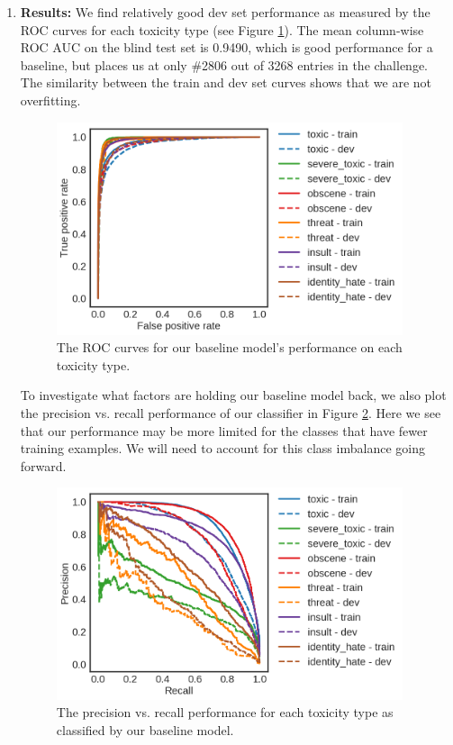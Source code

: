 \documentclass{article}
\begin{document}
\begin{enumerate}
    \item \textbf{Results:} We find relatively good dev set performance as measured by the ROC curves for each toxicity type (see Figure \ref{fig:roc}). The mean column-wise ROC AUC on the blind test set is 0.9490, which is good performance for a baseline, but places us at only \#2806 out of 3268 entries in the challenge. The similarity between the train and dev set curves shows that we are not overfitting.
    
    \begin{figure}[h]
    \centering
    \includegraphics[width=4in]{ff_l3_h302010_f300_roc.png}
    \caption{The ROC curves for our baseline model's performance on each toxicity type.}
    \label{fig:roc}
    \end{figure}
   
   To investigate what factors are holding our baseline model back, we also plot the precision vs. recall performance of our classifier in Figure \ref{fig:prc}. Here we see that our performance may be more limited for the classes that have fewer training examples. We will need to account for this class imbalance going forward.
   
   \begin{figure}[h]
   \centering
   \includegraphics[width=4in]{ff_l3_h302010_f300_prc.png}
   \caption{The precision vs. recall performance for each toxicity type as classified by our baseline model.}
   \label{fig:prc}
   \end{figure}
   

\end{enumerate}
\end{document}

